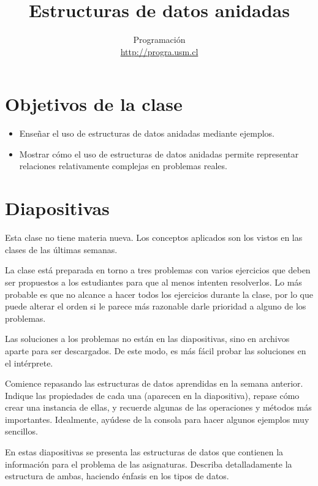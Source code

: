 \documentclass[10pt]{article}
\title{Estructuras de datos anidadas}
\author{Programación \\ \url{http://progra.usm.cl}}
\date{}
\begin{document}
  \maketitle

  \section*{Objetivos de la clase}
  \begin{itemize}
    \item Enseñar el uso de estructuras de datos anidadas mediante ejemplos.
    \item Mostrar cómo el uso de estructuras de datos anidadas
      permite representar relaciones relativamente complejas en problemas reales.
  \end{itemize}

  \section*{Diapositivas}

  Esta clase no tiene materia nueva.
  Los conceptos aplicados son los vistos en las clases de las últimas semanas.

  La clase está preparada en torno a tres problemas con varios ejercicios
  que deben ser propuestos a los estudiantes para que al menos intenten resolverlos.
  Lo más probable es que no alcance a hacer todos los ejercicios durante la clase,
  por lo que puede alterar el orden si le parece más razonable
  darle prioridad a alguno de los problemas.

  Las soluciones a los problemas no están en las diapositivas,
  sino en archivos aparte para ser descargados.
  De este modo, es más fácil probar las soluciones en el intérprete.


  Comience repasando las estructuras de datos aprendidas en la semana anterior.
  Indique las propiedades de cada una (aparecen en la diapositiva),
  repase cómo crear una instancia de ellas,
  y recuerde algunas de las operaciones y métodos más importantes.
  Idealmente, ayúdese de la consola para hacer algunos ejemplos muy sencillos.


  En estas diapositivas se presenta las estructuras de datos
  que contienen la información para el problema de las asignaturas.
  Describa detalladamente la estructura de ambas,
  haciendo énfasis en los tipos de datos.
\end{document}
